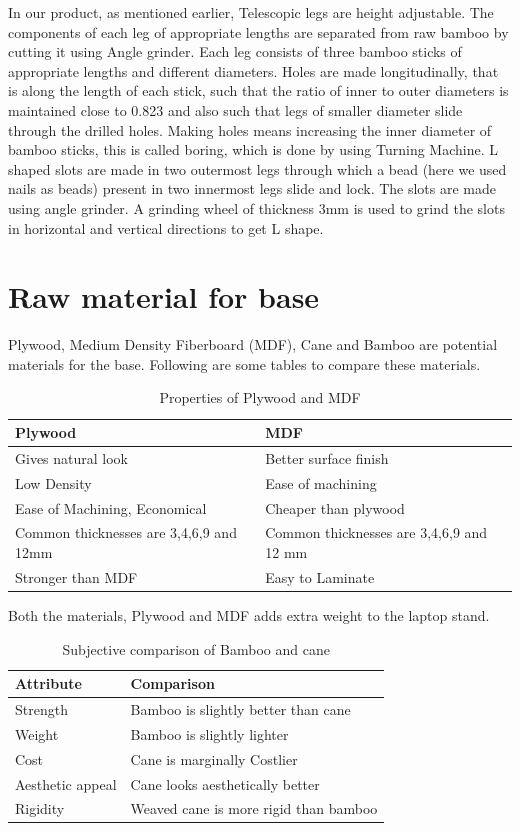 In our product, as mentioned earlier, Telescopic legs are height adjustable. The components of each leg of appropriate lengths are separated from raw bamboo by cutting it using Angle grinder. Each leg consists of three bamboo sticks of appropriate lengths and different diameters. Holes are made longitudinally, that is along the length of each stick, such that the ratio of inner to outer diameters is maintained close to 0.823 and also such that legs of smaller diameter slide through the drilled holes. Making holes means increasing the inner diameter of bamboo sticks, this is called boring, which is done by using Turning Machine. L shaped slots are made in two outermost legs through which a bead (here we used nails as beads) present in two innermost legs slide and lock. The slots are made using angle grinder. A grinding wheel of thickness 3mm is used to grind the slots in horizontal and vertical directions to get L shape.

\section{Raw material for base}

Plywood, Medium Density Fiberboard (MDF), Cane and Bamboo are potential materials for the base. Following are some tables to compare these materials\cite{bamboo_mdf}.

\begin{table}[h!]
  \centering
  \caption{Properties of Plywood and MDF}
  \label{tab:table4}
  \begin{tabular}{l||l}
  	\hline
  	Plywood & MDF\\
    \hline
	Gives natural look   & Better surface finish\\
	Low Density & Ease of machining\\
	Ease of Machining, Economical & Cheaper than plywood\\
	Common thicknesses are 3,4,6,9 and 12mm & Common thicknesses are 3,4,6,9 and 12 mm\\
	Stronger than MDF & Easy to Laminate\\
  \end{tabular}
\end{table}

Both the materials, Plywood and MDF adds extra weight to the laptop stand.

\begin{table}[h!]
  \centering
  \caption{Subjective comparison of Bamboo and cane}
  \label{tab:table5}
  \begin{tabular}{l||l}
  	\hline
  	Attribute & Comparison\\
    \hline    
	Strength & Bamboo is slightly better than cane\\
	Weight & Bamboo is slightly lighter \\
	Cost & Cane is marginally Costlier\\
	Aesthetic appeal & Cane looks aesthetically better\\
	Rigidity & Weaved cane is more rigid than bamboo\\

  \end{tabular}
\end{table}

